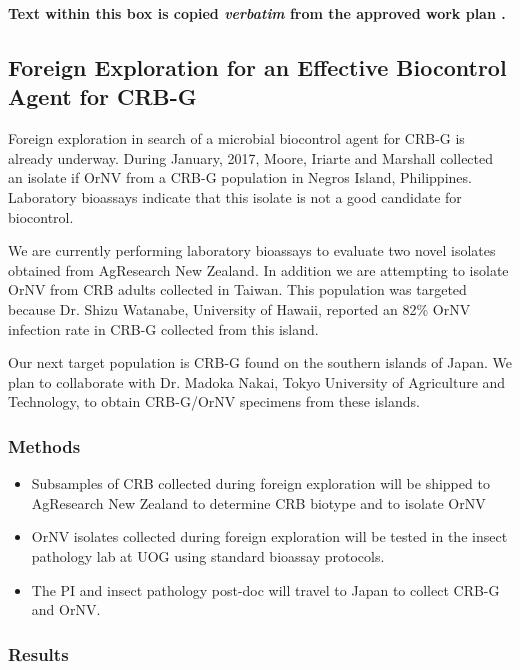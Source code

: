 \documentclass[12pt,letterpaper,english,bibliography=totocnumbered,abstract=on]{scrartcl}
\begin{document}
\newpage
\begin{framed}
	
\textbf{Text within this box is copied \emph{verbatim} from the approved work plan \cite{mooreWorkPlanAPHISPPA2020}.} 


\subsection{Foreign Exploration for an Effective Biocontrol Agent for CRB-G}

Foreign exploration in search of a microbial biocontrol agent for CRB-G is already underway. During January, 2017, Moore, Iriarte and Marshall collected an isolate if OrNV from a CRB-G population in Negros Island, Philippines. Laboratory bioassays indicate that this isolate is not a good candidate for biocontrol.

We are currently performing laboratory bioassays to evaluate two novel isolates obtained from AgResearch New Zealand. In addition we are attempting to isolate OrNV from CRB adults collected in Taiwan. This population was targeted because Dr. Shizu Watanabe, University of Hawaii, reported an 82\% OrNV infection rate in CRB-G collected from this island.

Our next target population is CRB-G found on the southern islands of Japan. We plan to collaborate with Dr. Madoka Nakai, Tokyo University of Agriculture and Technology, to obtain CRB-G/OrNV specimens from these islands.

\subsubsection*{Methods}

\begin{itemize}
	\item Subsamples of CRB collected during foreign exploration will be shipped to AgResearch New Zealand to determine CRB biotype and to isolate OrNV
	\item OrNV isolates collected during foreign exploration will be tested in the insect pathology lab at UOG using standard bioassay protocols.
	\item The PI and insect pathology post-doc will travel to Japan to collect CRB-G and OrNV. 
\end{itemize}
\end{framed}

\subsubsection{Results}
\end{document}
